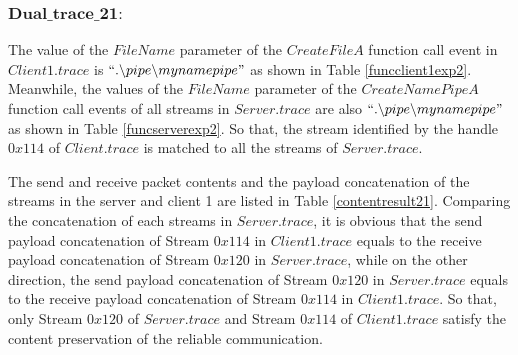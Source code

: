 \subsubsection{$\boldsymbol{Dual\_trace\_21:}$}
The value of the $FileName$ parameter of the $CreateFileA$ function call event in $Client1.trace$ is $``.\backslash pipe \backslash mynamepipe"$ as shown in Table \ref{funcclient1exp2}. Meanwhile, the values of the $FileName$ parameter of the $CreateNamePipeA$ function call events of all streams in $Server.trace$ are also $``.\backslash pipe \backslash mynamepipe"$ as shown in Table \ref{funcserverexp2}. So that, the stream identified by the handle $0x114$ of $Client.trace$ is matched to all the streams of $Server.trace$.

The send and receive packet contents and the payload concatenation of the streams in the server and client 1 are listed in Table \ref{contentresult21}. Comparing the concatenation of each streams in $Server.trace$, it is obvious that the send payload concatenation of Stream $0x114$ in $Client1.trace$ equals to the receive payload concatenation of Stream $0x120$ in $Server.trace$, while on the other direction, the send payload concatenation of Stream $0x120$ in $Server.trace$ equals to the receive payload concatenation of Stream $0x114$ in $Client1.trace$. So that, only Stream $0x120$ of $Server.trace$ and Stream $0x114$ of $Client1.trace$ satisfy the content preservation of the reliable communication. 

